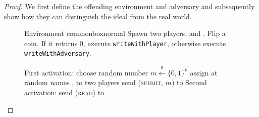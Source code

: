   \begin{proof}
    We first define the offending environment and adversary and subsequently
    show how they can distinguish the ideal from the real world.
    \begin{figure}[H]
      \begin{titlebox}{Environment \normalfont \perfectenv}{commonbox}{normal}
        Spawn two players, \alice{} and \bob. Flip a coin. If it returns 0,
        execute \texttt{writeWithPlayer}, otherwise execute
        \texttt{writeWithAdversary}.
        \begin{algorithmic}[1]
            \State First activation:
            \Indent
              \State choose random number $m \overset{\$}{\gets} \{0, 1\}^k$
              \State assign at random names \alice, \bob{} to two players
              \State send (\textsc{submit}, $m$) to \alice
            \EndIndent
            \State Second activation:
            \Indent
              \State send (\textsc{read}) to \bob
                \State {} 
                \label{fig:perfectledger:env:coin0:real}
                \State {} 
                \label{fig:perfectledger:env:coin0:comm}
                \State {} 
                \label{fig:perfectledger:env:coin0:nocomm}
              \EndIf
            \EndIndent
          \EndProcedure
          \Statex


\end{algorithmic}
\end{titlebox}
\end{figure}
\end{proof}

